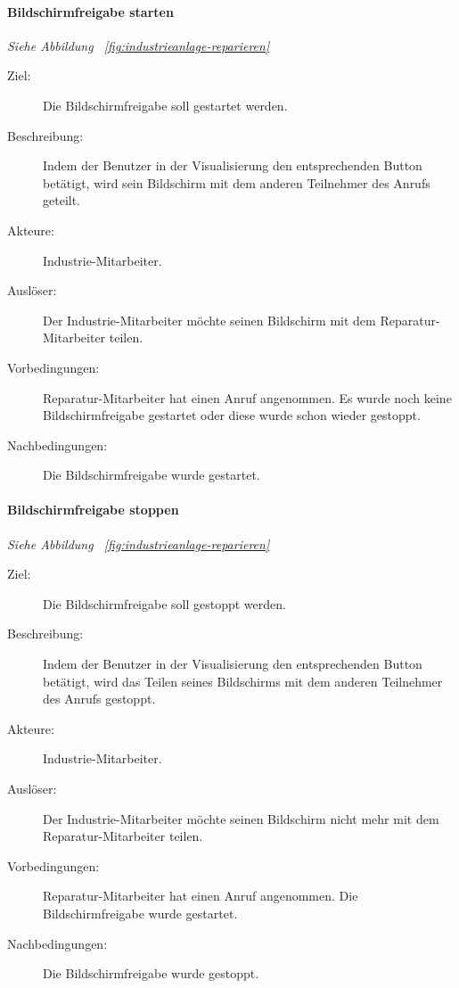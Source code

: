 \paragraph{\large{Bildschirmfreigabe starten}}
\textit{Siehe Abbildung ~\ref{fig:industrieanlage-reparieren}}
    \begin{description}
        \item[Ziel:] Die Bildschirmfreigabe soll gestartet werden.
        \item[Beschreibung:] Indem der Benutzer in der Visualisierung den entsprechenden Button betätigt, wird sein Bildschirm mit dem anderen Teilnehmer des Anrufs geteilt.
        \item[Akteure:] Industrie-Mitarbeiter.
        \item[Auslöser:] Der Industrie-Mitarbeiter möchte seinen Bildschirm mit dem Reparatur-Mitarbeiter teilen.
        \item[Vorbedingungen:] Reparatur-Mitarbeiter hat einen Anruf angenommen.
            Es wurde noch keine Bildschirmfreigabe gestartet oder diese wurde schon wieder gestoppt.
        \item[Nachbedingungen:] Die Bildschirmfreigabe wurde gestartet.
    \end{description}

\paragraph{\large{Bildschirmfreigabe stoppen}}
\textit{Siehe Abbildung ~\ref{fig:industrieanlage-reparieren}}
    \begin{description}
        \item[Ziel:] Die Bildschirmfreigabe soll gestoppt werden.
        \item[Beschreibung:] Indem der Benutzer in der Visualisierung den entsprechenden Button betätigt, wird das Teilen seines Bildschirms mit dem anderen Teilnehmer des Anrufs gestoppt.
        \item[Akteure:] Industrie-Mitarbeiter.
        \item[Auslöser:] Der Industrie-Mitarbeiter möchte seinen Bildschirm nicht mehr mit dem Reparatur-Mitarbeiter teilen.
        \item[Vorbedingungen:] Reparatur-Mitarbeiter hat einen Anruf angenommen.
            Die Bildschirmfreigabe wurde gestartet.
        \item[Nachbedingungen:] Die Bildschirmfreigabe wurde gestoppt.
    \end{description}

